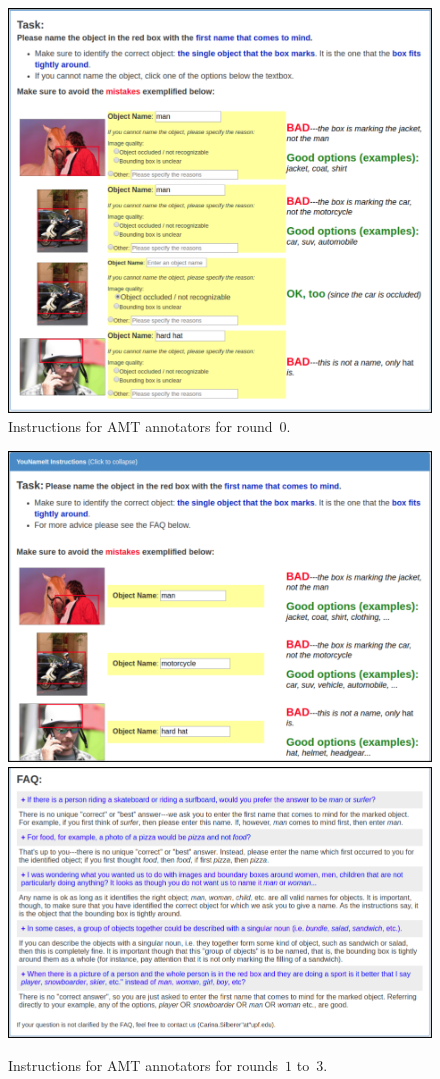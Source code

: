 
\begin{figure}
	\centering
	\includegraphics[width=2\columnwidth]{figures/round0.png}
	\caption{Instructions for AMT annotators for round~$0$.}
\end{figure}

\begin{figure}
	\centering
	\includegraphics[width=2\columnwidth]{figures/round1+_p1.png}
	\includegraphics[width=2\columnwidth]{figures/round1+_p2.png}
	\caption{Instructions for AMT annotators for rounds~$1$ to~$3$.}
\end{figure}